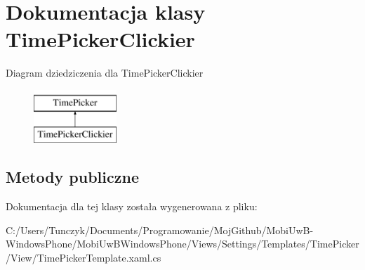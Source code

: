 \hypertarget{a00072}{}\section{Dokumentacja klasy Time\+Picker\+Clickier}
\label{a00072}
Diagram dziedziczenia dla Time\+Picker\+Clickier\begin{figure}[H]
\begin{center}
\leavevmode
\includegraphics[height=2.000000cm]{d6/d2c/a00072}
\end{center}
\end{figure}
\subsection*{Metody publiczne}


Dokumentacja dla tej klasy została wygenerowana z pliku\+:\begin{DoxyCompactItemize}
\item 
C\+:/\+Users/\+Tunczyk/\+Documents/\+Programowanie/\+Moj\+Github/\+Mobi\+Uw\+B-\/\+Windows\+Phone/\+Mobi\+Uw\+B\+Windows\+Phone/\+Views/\+Settings/\+Templates/\+Time\+Picker/\+View/Time\+Picker\+Template.\+xaml.\+cs\end{DoxyCompactItemize}

